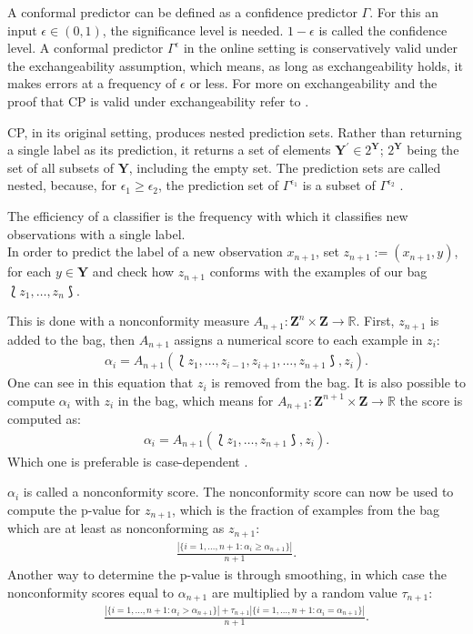 \documentclass[twoside,11pt]{article}
\begin{document}
A conformal predictor can be defined as a confidence
predictor $\Gamma$. For this an input $\epsilon \in (0,1)$,
the significance level is needed. $1 - \epsilon$ is called
the confidence level.
A conformal predictor $\Gamma^\epsilon$ in the online
setting is conservatively valid under the exchangeability
assumption, which means, as long as exchangeability holds,
it makes errors at a frequency of $\epsilon$ or less. For
more on exchangeability and the proof that CP is valid
under exchangeability refer to
\citet[][Chapters 1--4, 7]{alrw}.

CP, in its original setting, produces nested prediction
sets. Rather than returning a single label as its
prediction, it returns a set of elements
$\textbf{Y}^\prime \in 2^{\textbf{Y}}$; $2^{\textbf{Y}}$
being the set of all subsets of $\textbf{Y}$, including the
empty set.
The prediction sets are called nested, because, for
$\epsilon_1 \geq \epsilon_2$, the prediction set of
$\Gamma^{\epsilon_1}$ is a subset of $\Gamma^{\epsilon_2}$
\citep[see][Chapter 2]{alrw}.

The efficiency of a classifier is the frequency with which
it classifies new observations with a single label.
\\

\noindent
In order to predict the label of a new observation
$x_{n+1}$, set $z_{n+1}:=(x_{n+1}, y)$, for each
$y \in \textbf{Y}$ and check how $z_{n+1}$ conforms with
the examples of our bag $\Lbag z_1,\dots,z_n \Rbag$.

This is done with a nonconformity measure
$A_{n+1}:\textbf{Z}^n \times \textbf{Z} \rightarrow
\mathbb{R}$. First, $z_{n+1}$ is added to the bag, then
$A_{n+1}$ assigns a numerical score to each example in
$z_i$:
\begin{align}
  \alpha_i = A_{n+1}(\Lbag z_1,\dots,z_{i-1},z_{i+1},
             \dots,z_{n+1} \Rbag, z_i).
\label{eq:a0}
\end{align}
One can see in this equation that $z_i$ is removed from the
bag. It is also possible to compute $\alpha_i$ with $z_i$
in the bag, which means for
$A_{n+1}:\textbf{Z}^{n+1} \times \textbf{Z} \rightarrow
\mathbb{R}$ the score is computed as:
\begin{align}
  \alpha_i = A_{n+1}(\Lbag z_1,\dots,z_{n+1} \Rbag, z_i).
\label{eq:a1}
\end{align}
Which one is preferable is case-dependent
\citep[see][Chapter 4.2.2]{shafer_et_al_2008}.

$\alpha_i$ is called a nonconformity score.
The nonconformity score can now be used to compute the
p-value for $z_{n+1}$, which is the fraction of examples
from the bag which are at least as nonconforming as
$z_{n+1}$:
\begin{align}
  \frac{|\{i=1,\dots,n+1: \alpha_i \geq \alpha_{n+1}\}|}
       {n + 1}.
\label{eq:p0}
\end{align}
Another way to determine the p-value is through smoothing,
in which case the nonconformity scores equal to
$\alpha_{n+1}$ are multiplied by a random value
$\tau_{n+1}$:
\begin{align}
  \frac{|\{i=1,\dots,n+1: \alpha_i > \alpha_{n+1}\}|
    + \tau_{n+1} |\{i=1,\dots,n+1:\alpha_i=\alpha_{n+1}\}|}
       {n + 1}.
\label{eq:p1}
\end{align}
\end{document}
